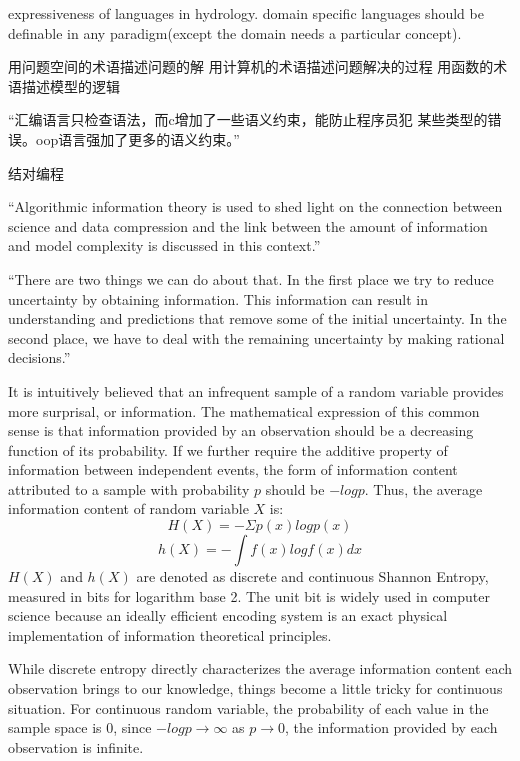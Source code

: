 expressiveness of languages in hydrology.
domain specific languages should be definable in any 
paradigm(except the domain needs a particular concept).


用问题空间的术语描述问题的解
用计算机的术语描述问题解决的过程
用函数的术语描述模型的逻辑

“汇编语言只检查语法，而c增加了一些语义约束，能防止程序员犯
某些类型的错误。oop语言强加了更多的语义约束。”


结对编程 

“Algorithmic information theory is used to shed light on 
the connection
between science and data compression and the link between 
the amount of information
and model complexity is discussed in this context.”

“There are two things we can do about that. In the first
place we try to reduce uncertainty by obtaining 
information. This information can result
in understanding and predictions that remove some of the 
initial uncertainty. In the second
place, we have to deal with the remaining uncertainty by 
making rational decisions.”


It is intuitively believed that an infrequent sample of a 
random variable provides more surprisal, or information. 
The  mathematical expression of this common sense is that 
information provided by an observation should be a 
decreasing function of its probability. If we further 
require the additive property of information between 
independent events, the form of information content 
attributed to a sample with probability $p$ should be $-
logp$. Thus, the average information content of random 
variable $X$ is:
\begin{equation}
H(X)=-\Sigma p(x)logp(x)
\end{equation}
\begin{equation}
h(X)=-\int f(x)logf(x)dx
\end{equation}   
$H(X)$ and $h(X)$ are denoted as discrete and continuous 
Shannon Entropy, measured in bits for logarithm base 2. The 
unit bit is widely used in computer science because an 
ideally efficient encoding system is an exact physical 
implementation of information theoretical principles. 

While discrete entropy directly characterizes the average 
information content each observation brings to our 
knowledge, things become a little tricky for continuous 
situation. For continuous random variable, the probability 
of each value in the sample space is 0, since $-logp \to 
\infty$  as $p \to 0$, the information provided by each 
observation is infinite.  

